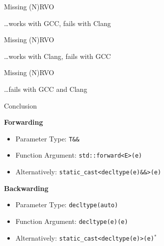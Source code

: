 \begin{frame}
\end{frame}

\begin{frame}
    \scalebox{3.}{More things that don't work}
\end{frame}

\begin{frame}[fragile]{Missing (N)RVO}

    \hfill \ldots works with GCC, fails with Clang
\end{frame}


\begin{frame}[fragile]{Missing (N)RVO}

    \hfill \ldots works with Clang, fails with GCC
\end{frame}

\begin{frame}[fragile]{Missing (N)RVO}

    \hfill \ldots fails with GCC and Clang
\end{frame}

\begin{frame}{Conclusion}
    \begin{center}
    \end{center}
    
    \textbf{Forwarding}
    \begin{itemize}
        \item Parameter Type: \texttt{T\&\&}
        \item Function Argument: \texttt{std::forward<E>(e)}
        \item Alternatively: \texttt{static\_cast<decltype(e)\&\&>(e)}
    \end{itemize}

    \textbf{Backwarding}
    \begin{itemize}
        \item Parameter Type: \texttt{decltype(auto)}
        \item Function Argument: \texttt{decltype(e)(e)}
        \item Alternatively: \texttt{static\_cast<decltype(e)>(e)}$^*$
    \end{itemize}
\end{frame}
